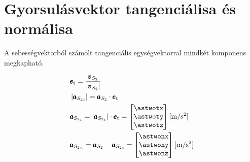 \section{Gyorsulásvektor tangenciálisa és normálisa}

A sebességvektorból számolt tangenciális egységvektorral mindkét komponens megkapható.

\begin{align}
	&\pmb{e}_\text{t} = 
	\frac{\pmb{v}_{S_2}}{\left|\pmb{v}_{S_2}\right|} \\
	&\left| \pmb{a}_{{S_2}_t} \right| = 
	\pmb{a}_{S_2} \cdot \pmb{e}_\text{t} \\
	&\pmb{a}_{{S_2}_t} = 
	\left|\pmb{a}_{{S_2}_t}\right| \cdot \pmb{e}_\text{t} = 
	\begin{bmatrix}
		\astwotx \\ \astwoty \\ \astwotz
	\end{bmatrix} \siunit{}{\m\per\second^2} \\
	&\pmb{a}_{{S_2}_n} = \pmb{a}_{{S_2}} - \pmb{a}_{{S_2}_t} =
	\begin{bmatrix}
		\astwonx \\ \astwony \\ \astwonz
	\end{bmatrix} \siunit{}{\m\per\second^2}
\end{align}
